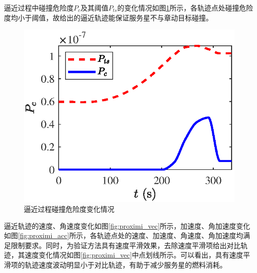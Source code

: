 \documentclass[lang=chs, degree=master, blindreview=false, winfonts=true]{yanputhesis}
\begin{document}

逼近过程中碰撞危险度$P_c$及其阈值$P_{ts}$的变化情况如图\ref{fig.Ps_pts}所示，各轨迹点处碰撞危险度均小于阈值，故给出的逼近轨迹能保证服务星不与章动目标碰撞。

\begin{figure}[htb!]
	\centering
	\includegraphics[width= 3.55 in]{picture/pts_ps.eps}
	\caption{逼近过程碰撞危险度变化情况}
	\label{fig.Ps_pts}
\end{figure}

逼近轨迹的速度、角速度变化如图\ref{fig:proximi_vec}所示，加速度、角加速度变化如图\ref{fig:proximi_acc}所示，各轨迹点处的速度、加速度、角速度、角加速度均满足限制要求。同时，为验证方法具有速度平滑效果，去除速度平滑项给出对比轨迹，其速度变化情况如图\ref{fig:proximi_vec}中点划线所示。可以看出，具有速度平滑项的轨迹速度波动明显小于对比轨迹，有助于减少服务星的燃料消耗。
\end{document}
